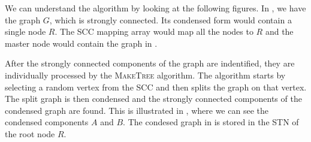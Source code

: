 We can understand the algorithm by looking at the following figures.
In \figureref{\ref{fig:graph1_and_condensed_graph1}}, we have the graph $G$, which is strongly connected.
Its condensed form would contain a single node $R$. The SCC mapping array would map all the nodes to $R$ and the master node 
would contain the graph in \figureref{\ref{fig:condensed_graph1}}.

After the strongly connected components of the graph are indentified, they are individually processed by the 
\textsc{MakeTree} algorithm. The algorithm starts by selecting a random vertex from the SCC and then splits the graph
on that vertex. The split graph is then condensed and the strongly connected components of the condensed graph are found. 
This is illustrated in \figureref{\ref{fig:scc_r_split_and_condensed_graph1}}, where we can see the condensed components $A$ and $B$.
The condesed graph in \figureref{\ref{fig:condensed_scc_r_split}} is stored in the \textsc{STN} of the root node $R$.
